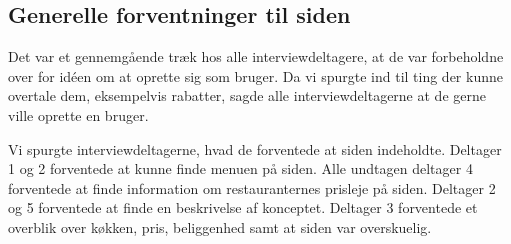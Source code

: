 \documentclass[a4paper, 12pt]{article}
\begin{document}


\subsection{Generelle forventninger til siden}

Det var et gennemgående træk hos alle interviewdeltagere, at de var forbeholdne
over for idéen om at oprette sig som bruger. Da vi spurgte ind til ting der
kunne overtale dem, eksempelvis rabatter, sagde alle interviewdeltagerne at de
gerne ville oprette en bruger.

Vi spurgte interviewdeltagerne, hvad de forventede at siden indeholdte. Deltager 1
og 2 forventede at kunne finde menuen på siden. Alle undtagen deltager 4
forventede at finde information om restauranternes prisleje på siden. Deltager 2
og 5 forventede at finde en beskrivelse af konceptet. Deltager 3 forventede et
overblik over køkken, pris, beliggenhed samt at siden var overskuelig.


\end{document}
